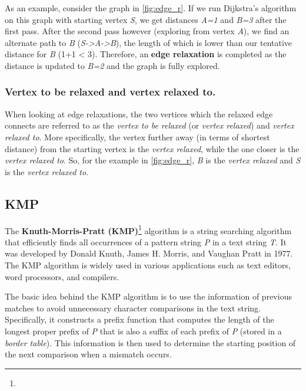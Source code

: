 \documentclass{l4proj}
\begin{document}

As an example, consider the graph in \autoref{fig:edge_r}. If we run Dijkstra's algorithm on this graph with starting vertex \emph{S}, we get distances \emph{A=1} and \emph{B=3} after the first pass. After the second pass however (exploring from vertex \emph{A}), we find an alternate path to \emph{B} (\emph{S->A->B}), the length of which is lower than our tentative distance for \emph{B} (1+1 < 3). Therefore, an \textbf{edge relaxation} is completed as the distance is updated to \emph{B=2} and the graph is fully explored.

\subsubsection{Vertex to be relaxed and vertex relaxed to.}

When looking at edge relaxations, the two vertices which the relaxed edge connects are referred to as the \emph{vertex to be relaxed} (or \emph{vertex relaxed}) and \emph{vertex relaxed to}. More specifically, the vertex further away (in terms of shortest distance) from the starting vertex is the \emph{vertex relaxed}, while the one closer is the \emph{vertex relaxed to}. So, for the example in \autoref{fig:edge_r}, \emph{B} is the \emph{vertex relaxed} and \emph{S} is the \emph{vertex relaxed to}.

\subsection{KMP}

The \textbf{Knuth-Morris-Pratt (KMP)}\footnote{} algorithm is a string searching algorithm that efficiently finds all occurrences of a pattern string \emph{P} in a text string \emph{T}. It was developed by Donald Knuth, James H. Morris, and Vaughan Pratt in 1977. The KMP algorithm is widely used in various applications such as text editors, word processors, and compilers.

The basic idea behind the KMP algorithm is to use the information of previous matches to avoid unnecessary character comparisons in the text string. Specifically, it constructs a prefix function that computes the length of the longest proper prefix of \emph{P} that is also a suffix of each prefix of \emph{P} (stored in a \emph{border table}). This information is then used to determine the starting position of the next comparison when a mismatch occurs.
\end{document}
